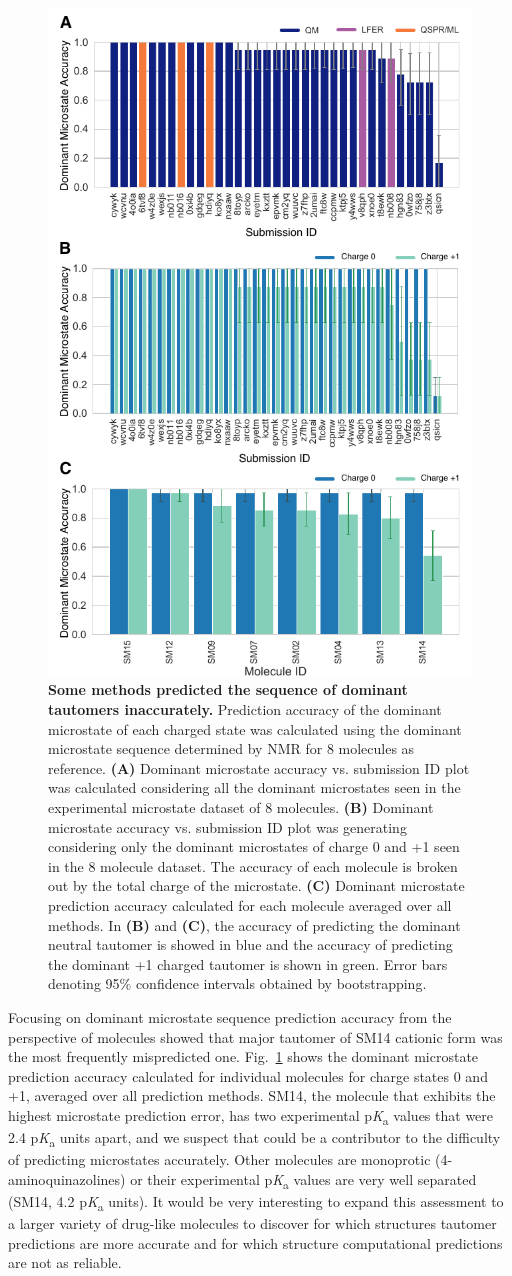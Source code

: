 \documentclass[9pt,lineno,final]{elife}
\newcommand{\pKa}{p\textit{K}\textsubscript{a}}
\begin{document}
\begin{figure}[h!]
\centering
\includegraphics[width=0.5\linewidth]{figures/typeI_dominant_microstate_accuracy.pdf}
\caption{{\bf Some methods predicted the sequence of dominant tautomers inaccurately.} Prediction accuracy of the dominant microstate of each charged state was calculated using the dominant microstate sequence determined by NMR for 8 molecules as reference. 
{\bf(A)} Dominant microstate accuracy vs. submission ID plot was calculated considering all the dominant microstates seen in the experimental microstate dataset of 8 molecules. {\bf(B)} Dominant microstate accuracy vs. submission ID plot was generating considering only the dominant microstates of charge 0 and +1 seen in the 8 molecule dataset. The accuracy of each molecule is broken out by the total charge of the microstate. {\bf(C)} Dominant microstate prediction accuracy calculated for each molecule averaged over all methods. In {\bf(B)} and {\bf(C)}, the accuracy of predicting the dominant neutral tautomer is showed in blue and the accuracy of predicting the dominant +1 charged tautomer is shown in green. Error bars denoting 95\% confidence intervals obtained by bootstrapping.
}
\label{fig:typeI_dominant_microstate_accuracy}
\end{figure}

Focusing on dominant microstate sequence prediction accuracy from the perspective of molecules showed that major tautomer of SM14 cationic form was the most frequently mispredicted one. 
Fig.~\ref{fig:typeI_dominant_microstate_accuracy} shows the dominant microstate prediction accuracy calculated for individual molecules for charge states 0 and +1, averaged over all prediction methods. 
SM14, the molecule that exhibits the highest microstate prediction error, has two experimental \pKa{} values that were 2.4 \pKa{} units apart, and we suspect that could be a contributor to the difficulty of predicting microstates accurately. 
Other molecules are monoprotic (4-aminoquinazolines) or their experimental \pKa{} values are very well separated (SM14, 4.2 \pKa{} units). 
It would be very interesting to expand this assessment to a larger variety of drug-like molecules to discover for which structures tautomer predictions are more accurate and for which structure computational predictions are not as reliable.
\end{document}
